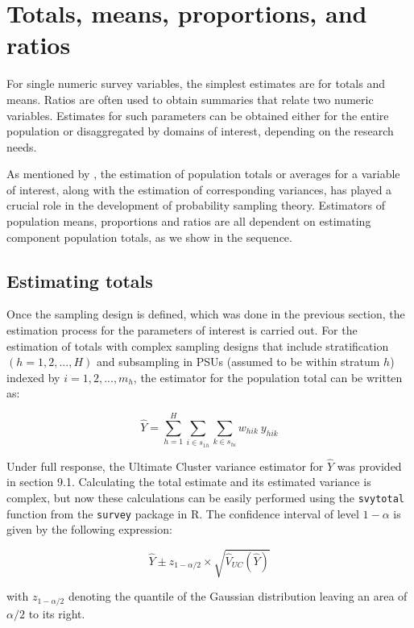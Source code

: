 \documentclass[
  12pt,
]{book}
\begin{document}
\section{Totals, means, proportions, and ratios}\label{totals-means-proportions-and-ratios}

For single numeric survey variables, the simplest estimates are for totals and means. Ratios are often used to obtain summaries that relate two numeric variables. Estimates for such parameters can be obtained either for the entire population or disaggregated by domains of interest, depending on the research needs.

As mentioned by \citet{Heeringa_West_Berglund_2017}, the estimation of population totals or averages for a variable of interest, along with the estimation of corresponding variances, has played a crucial role in the development of probability sampling theory. Estimators of population means, proportions and ratios are all dependent on estimating component population totals, as we show in the sequence.

\subsection{Estimating totals}\label{estimating-totals}

Once the sampling design is defined, which was done in the previous section, the estimation process for the parameters of interest is carried out. For the estimation of totals with complex sampling designs that include stratification \(\left(h=1,2,...,H\right)\) and subsampling in PSUs (assumed to be within stratum \(h\)) indexed by \(i=1,2,...,m_h\), the estimator for the population total can be written as:

\[
\widehat{Y} = \sum_{h=1}^{H}\sum_{i \in s_{1h}} \sum_{ k \in s_{hi}} w_{hik} \ y_{hik}
\]

Under full response, the Ultimate Cluster variance estimator for \(\widehat{Y}\) was provided in section 9.1. Calculating the total estimate and its estimated variance is complex, but now these calculations can be easily performed using the \texttt{svytotal} function from the \texttt{survey} package in R. The confidence interval of level \(1 - \alpha\) is given by the following expression:

\[
\widehat{Y} \pm z_{1 - \alpha/2} \times \sqrt{\widehat{V}_{UC} \left( \widehat{Y}\right)}
\]

with \(z_{1 - \alpha/2}\) denoting the quantile of the Gaussian distribution leaving an area of \({\alpha/2}\) to its right.
\end{document}
